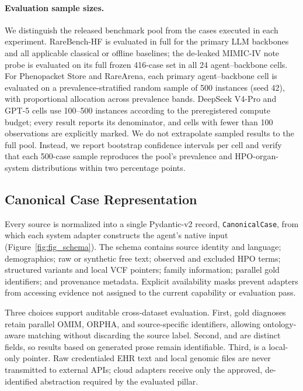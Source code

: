\documentclass[letterpaper]{article} %
\begin{document}
\paragraph{Evaluation sample sizes.}
We distinguish the released benchmark pool from the cases executed in each experiment. RareBench-HF is evaluated in full for the primary LLM backbones and all applicable classical or offline baselines; the de-leaked MIMIC-IV note probe is evaluated on its full frozen 416-case set in all 24 agent--backbone cells. For Phenopacket Store and RareArena, each primary agent--backbone cell is evaluated on a prevalence-stratified random sample of 500 instances (seed 42), with proportional allocation across prevalence bands. DeepSeek V4-Pro and GPT-5 cells use 100--500 instances according to the preregistered compute budget; every result reports its denominator, and cells with fewer than 100 observations are explicitly marked. We do not extrapolate sampled results to the full pool. Instead, we report bootstrap confidence intervals per cell and verify that each 500-case sample reproduces the pool's prevalence and HPO-organ-system distributions within two percentage points.

\subsection{Canonical Case Representation}
\label{sec-4-3}

Every source is normalized into a single Pydantic-v2 record, \texttt{CanonicalCase}, from which each system adapter constructs the agent's native input (Figure~\ref{fig:fig_schema}). The schema contains source identity and language; demographics; raw or synthetic free text; observed and excluded HPO terms; structured variants and local VCF pointers; family information; parallel gold identifiers; and provenance metadata. Explicit availability masks prevent adapters from accessing evidence not assigned to the current capability or evaluation pass.

Three choices support auditable cross-dataset evaluation. First, gold diagnoses retain parallel OMIM, ORPHA, and source-specific identifiers, allowing ontology-aware matching without discarding the source label. Second,  and  are distinct fields, so results based on generated prose remain identifiable. Third,  is a local-only pointer. Raw credentialed EHR text and local genomic files are never transmitted to external APIs; cloud adapters receive only the approved, de-identified abstraction required by the evaluated pillar.
\end{document}
